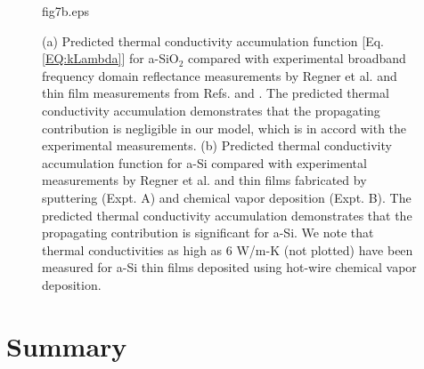 \documentclass[aps,prb,twocolumn,superscriptaddress,footinbib,amsmath,amssymb,floatfix]{revtex4}
\begin{document}
\begin{figure}
\begin{center}
{fig7b.eps}
\vspace*{-5mm}
\end{center}
\caption{\label{FIG:sio2_accum} 
{\scriptsize
(a) Predicted thermal conductivity 
accumulation function [Eq. \eqref{EQ:kLambda}]  
for a-SiO$_2$ compared with experimental broadband frequency 
domain reflectance measurements 
by Regner et al.\cite{regner_broadband_2013} and thin film 
measurements from Refs.  and 
. 
The predicted thermal conductivity accumulation demonstrates that 
the propagating contribution is negligible in our model, which is 
in accord with the experimental measurements. 
(b) Predicted thermal conductivity 
accumulation function 
for a-Si compared with experimental measurements 
by Regner et al. and thin films fabricated by    
sputtering (Expt. A)
\cite{kuo_thermal_1992,wada_thermal_1996,cahill_thermal_1994} 
and chemical vapor deposition (Expt. B).
\cite{hasselman_thermal_1989,moon_thermal_2002,liu_high_2009,
yang_anomalously_2010} 
The predicted thermal conductivity accumulation demonstrates that 
the propagating contribution is significant for a-Si. 
We note that thermal conductivities as high as 6 W/m-K (not plotted) 
have been measured for a-Si thin films deposited using 
hot-wire chemical vapor deposition.
\cite{yang_anomalously_2010}}}
\end{figure}


\clearpage

\section{\label{S:Lifetimes}Summary}
\end{document}

